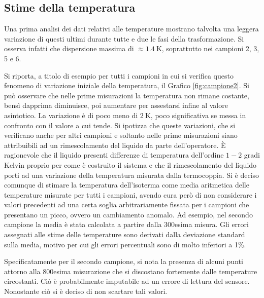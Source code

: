 \documentclass[a4paper,11pt,oneside]{article}
\begin{document}
\subsection{Stime della temperatura}
Una prima analisi dei dati relativi alle temperature mostrano talvolta una leggera variazione di questi ultimi durante tutte e due le fasi della trasformazione. Si osserva infatti che dispersione massima di $\approx \SI{1.4}{\kelvin}$, soprattutto nei campioni 2, 3, 5 e 6. 

Si riporta, a titolo di esempio per tutti i campioni in cui si verifica questo fenomeno di variazione iniziale della temperatura, il Grafico \ref{fig:campione2}. Si può osservare che nelle prime misurazioni la temperatura non rimane costante, bensì dapprima diminuisce, poi aumentare per assestarsi infine al valore asintotico. La variazione è di poco meno di $\SI{2}{\kelvin}$, poco significativa se messa in confronto con il valore a cui tende. %
Si ipotizza che queste variazioni, che si verificano anche per altri campioni e soltanto nelle prime misurazioni siano attribuibili ad un rimescolamento del liquido da parte dell'operatore. È ragionevole che il liquido presenti differenze di temperatura dell'ordine $1-2$ gradi Kelvin proprio per come è costruito il sistema e che il rimescolamento del liquido porti ad una variazione della temperatura misurata dalla termocoppia. 
Si è deciso comunque di stimare la temperatura dell'isoterma come media aritmetica delle temperature misurate per tutti i campioni, avendo cura però di non considerare i valori precedenti ad una certa soglia arbitrariamente fissata per i campioni che presentano un picco, ovvero un cambiamento anomalo. Ad esempio, nel secondo campione la media è stata calcolata a partire dalla 300esima misura. Gli errori assegnati alle stime delle temperature sono derivati dalla deviazione standard sulla media, motivo per cui gli errori percentuali sono di molto inferiori a 1\%.

Specificatamente per il secondo campione, si nota la presenza di alcuni punti attorno alla 800esima misurazione che si discostano fortemente dalle temperature circostanti. Ciò è probabilmente imputabile ad un errore di lettura del sensore. Nonostante ciò si è deciso di non scartare tali valori.
\end{document}

